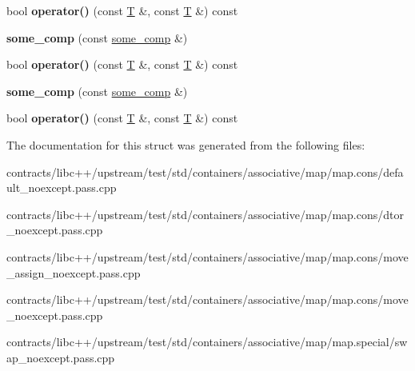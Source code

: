 \begin{DoxyCompactItemize}
\mbox{\label{structsome__comp_a6a7124af43ee189c025dee7d7482eaba}} 
bool {\bfseries operator()} (const \mbox{\hyperlink{struct_t}{T}} \&, const \mbox{\hyperlink{struct_t}{T}} \&) const
\item 
\mbox{\label{structsome__comp_acb6b551db492c34e1354464e12b57857}} 
{\bfseries some\+\_\+comp} (const \mbox{\hyperlink{structsome__comp}{some\+\_\+comp}} \&)
\item 
\mbox{\label{structsome__comp_a6a7124af43ee189c025dee7d7482eaba}} 
bool {\bfseries operator()} (const \mbox{\hyperlink{struct_t}{T}} \&, const \mbox{\hyperlink{struct_t}{T}} \&) const
\item 
\mbox{\label{structsome__comp_acb6b551db492c34e1354464e12b57857}} 
{\bfseries some\+\_\+comp} (const \mbox{\hyperlink{structsome__comp}{some\+\_\+comp}} \&)
\item 
\mbox{\label{structsome__comp_a6a7124af43ee189c025dee7d7482eaba}} 
bool {\bfseries operator()} (const \mbox{\hyperlink{struct_t}{T}} \&, const \mbox{\hyperlink{struct_t}{T}} \&) const
\end{DoxyCompactItemize}


The documentation for this struct was generated from the following files\+:\begin{DoxyCompactItemize}
\item 
contracts/libc++/upstream/test/std/containers/associative/map/map.\+cons/default\+\_\+noexcept.\+pass.\+cpp\item 
contracts/libc++/upstream/test/std/containers/associative/map/map.\+cons/dtor\+\_\+noexcept.\+pass.\+cpp\item 
contracts/libc++/upstream/test/std/containers/associative/map/map.\+cons/move\+\_\+assign\+\_\+noexcept.\+pass.\+cpp\item 
contracts/libc++/upstream/test/std/containers/associative/map/map.\+cons/move\+\_\+noexcept.\+pass.\+cpp\item 
contracts/libc++/upstream/test/std/containers/associative/map/map.\+special/swap\+\_\+noexcept.\+pass.\+cpp\end{DoxyCompactItemize}
